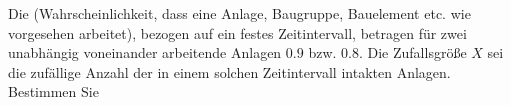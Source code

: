 \documentclass{abgabe}
\begin{document}
\begin{questions}
    \question
    Die  (Wahrscheinlichkeit, dass eine Anlage, Baugruppe, Bauelement etc. wie vorgesehen arbeitet), bezogen auf ein festes Zeitintervall, betragen für zwei unabhängig voneinander arbeitende Anlagen $0.9$ bzw. $0.8$. 
    Die Zufallsgröße $X$ sei die zufällige Anzahl der in einem solchen Zeitintervall intakten Anlagen. 
    Bestimmen Sie
\end{questions}
\end{document}

